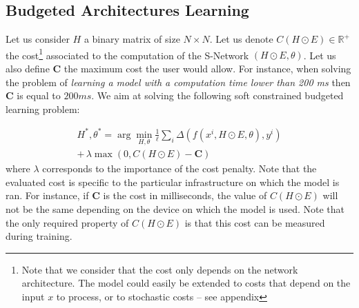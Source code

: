 \documentclass[10pt,twocolumn,letterpaper]{article}
\begin{document}
\subsection{Budgeted Architectures Learning} 
\label{s3}
Let us consider $H$ a binary matrix of size $N \times N$. Let us denote $C(H \odot E) \in \mathbb{R}^+$ the cost\footnote{Note that we consider that the cost only depends on the network architecture. The model could easily be extended to costs that depend on the input $x$ to process, or to stochastic costs -- see appendix} associated to the computation of the S-Network $(H \odot E,\theta)$. Let us also define $\mathbf{C}$ the maximum cost the user would allow. For instance, when solving the problem of \textit{learning a model with a computation time lower than 200 ms} then $\mathbf{C}$ is equal to $200 ms$. We aim at solving the following soft constrained budgeted learning problem:

\begin{multline} \label{objective}
H^*,\theta^* = \arg \min\limits_{H,\theta} \frac{1}{\ell} \sum\limits_i \Delta(f(x^i,H \odot E, \theta),y^i)
\\ + \, \lambda \max(0,C(H \odot E)-\mathbf{C})
\end{multline}
where $\lambda$ corresponds to the importance of the cost penalty. Note that the evaluated cost is specific to the particular infrastructure on which the model is ran. For instance, if $\mathbf{C}$ is the cost in milliseconds, the value of $C(H \odot E)$ will not be the same depending on the device on which the model is used. Note that the only required property of $C(H \odot E)$ is that this cost can be measured during training.
\end{document}
